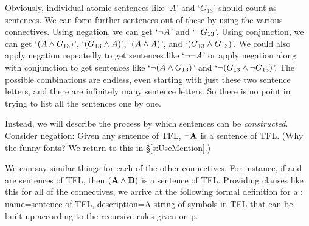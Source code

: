 Obviously, individual atomic sentences like `$A$' and `$G_{13}$' should count as sentences. We can form further sentences out of these by using the various connectives. Using negation, we can get `$\neg A$' and `$\neg G_{13}$'. Using conjunction, we can get `$(A \wedge G_{13})$', `$(G_{13} \wedge A)$', `$(A \wedge A)$', and `$(G_{13} \wedge G_{13})$'. We could also apply negation repeatedly to get sentences like `$\neg \neg A$' or apply negation along with conjunction to get sentences like `$\neg(A \wedge G_{13})$' and `$\neg(G_{13} \wedge \neg G_{13})$'. The possible combinations are endless, even starting with just these two sentence letters, and there are infinitely many sentence letters. So there is no point in trying to list all the sentences one by one.

Instead, we will describe the process by which sentences can be \emph{constructed}. Consider negation: Given any sentence  of TFL, $\neg\mathbf{A}$ is a sentence of TFL. (Why the funny fonts? We return to this in \S\ref{s:UseMention}.)

We can say similar things for each of the other connectives. For instance, if  and  are sentences of TFL, then $(\mathbf{A}\wedge\mathbf{B})$ is a sentence of TFL. Providing clauses like this for all of the connectives, we arrive at the following formal definition for a :
{
name=sentence of TFL,
description={A string of symbols in TFL that can be built up according to the recursive rules given on p.~\pageref{TFLsentences}}
}

